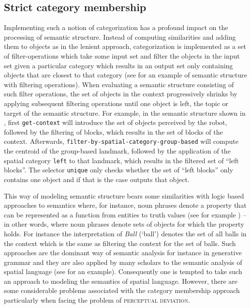 \subsection{Strict category membership}
Implementing such a notion of categorization has a profound 
impact on the processing of semantic structure. Instead of computing 
similarities and adding them to objects as in the lenient approach, categorization 
is implemented as a set of filter-operations which take some input set and filter the 
objects in the input set given a particular category which results in an 
output set only containing objects that are closest to that category (see 
 for an example of semantic structure with 
filtering operations). When evaluating a semantic structure
consisting of such filter operations, the set of objects in the context progressively
shrinks by applying subsequent filtering operations until one object is left, 
the topic or target of the semantic structure. For example, 
in the semantic structure shown in , first
{\footnotesize\tt get-context} will introduce the set of objects perceived by
the robot, followed by the filtering of blocks, which results in the
set of blocks of the context. Afterwards, 
{\footnotesize\tt filter-by-spatial-category-group-based} will compute the centroid
of the group-based landmark, followed by the application of the 
spatial category {\footnotesize\tt left} to that landmark, which results in the
filtered set of ``left blocks''. The selector {\footnotesize\tt unique} only
checks whether the set of ``left blocks'' only contains one
object and if that is the case outputs that object.

This way of modeling semantic structure bears some similarities with
logic based approaches to semantics where, for instance, noun phrases denote a 
property that can be represented as a function from entities to truth 
values (see for example \citealt{barwise1981generalized}) -- in other words, where noun phrases denote sets of objects for which
the property holds. For instance the interpretation of \textit{Ball} (`ball') denotes 
the set of all balls in the context which is the same as filtering the context
for the set of balls. Such approaches are the dominant way of semantic
analysis for instance in generative grammar and they are also applied 
by many scholars to the semantic analysis of spatial language (see 
\citealt{eschenbach1997axiomatic} for an example). Consequently
one is tempted to take such an approach to modeling the semantics
of spatial language. However, there are some considerable problems
associated with the category membership approach particularly when 
facing the problem of \textsc{perceptual deviation}.

